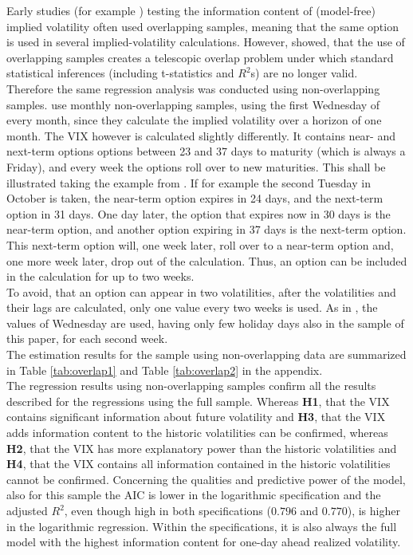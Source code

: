 Early studies (for example \textcite{canina1993}) testing the information content of (model-free) implied volatility often used overlapping samples, meaning that the same option is used in several implied-volatility calculations. However, \textcite{christensen2001} showed, that the use of overlapping samples creates a telescopic overlap problem under which standard statistical inferences (including t-statistics and $R^{2}$s) are no longer valid.\\
Therefore the same regression analysis was conducted using non-overlapping samples. \textcite{jiang2003} use monthly non-overlapping samples, using the first Wednesday of every month, since they calculate the implied volatility over a horizon of one month. The VIX however is calculated slightly differently. It contains near- and next-term options options between 23 and 37 days to maturity (which is always a Friday), and every week the options roll over to new maturities. This shall be illustrated taking the example from \textcite{exchange2009}. If for example the second Tuesday in October is taken, the near-term option expires in 24 days, and the next-term option in 31 days. One day later, the option that expires now in 30 days is the near-term option, and another option expiring in 37 days is the next-term option. This next-term option will, one week later, roll over to a near-term option and, one more week later, drop out of the calculation. Thus, an option can be included in the calculation for up to two weeks. \\
To avoid, that an option can appear in two volatilities, after the volatilities and their lags are calculated, only one value every two weeks is used. As in \textcite{jiang2003}, the values of Wednesday are used, having only few holiday days also in the sample of this paper, for each second week.\\
The estimation results for the sample using non-overlapping data are summarized in Table \ref{tab:overlap1} and Table \ref{tab:overlap2} in the appendix.\\
The regression results using non-overlapping samples confirm all the results described for the regressions using the full sample. Whereas \textbf{\ac{H1}}, that the VIX contains significant information about future volatility and \textbf{\ac{H3}}, that the VIX adds information content to the historic volatilities can be confirmed, whereas \textbf{\ac{H2}}, that the VIX has more explanatory power than the historic volatilities and \textbf{\ac{H4}}, that the VIX contains all information contained in the historic volatilities cannot be confirmed. Concerning the qualities and predictive power of the model, also for this sample the AIC is lower in the logarithmic specification and the adjusted $R^{2}$, even though high in both specifications ($0.796$ and $0.770$), is higher in the logarithmic regression. Within the specifications, it is also always the full model with the highest information content for one-day ahead realized volatility.\\
